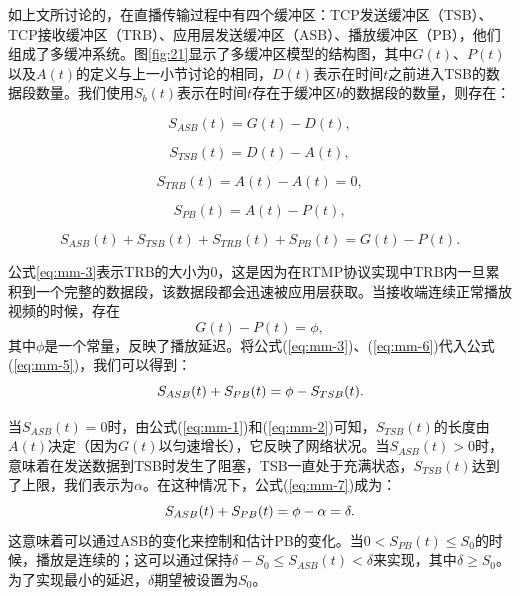 如上文所讨论的，在直播传输过程中有四个缓冲区：TCP发送缓冲区（TSB）、TCP接收缓冲区（TRB）、应用层发送缓冲区（ASB）、播放缓冲区（PB），他们组成了多缓冲系统。图\ref{fig:21}显示了多缓冲区模型的结构图，其中$G(t)$、$P(t)$以及$A(t)$的定义与上一小节讨论的相同，$D(t)$表示在时间$t$之前进入TSB的数据段数量。我们使用$S_b(t)$表示在时间$t$存在于缓冲区$b$的数据段的数量，则存在：

\begin{equation}
\label{eq:mm-1}
S_{ASB}(t)=G(t)-D(t),
\end{equation}

\begin{equation}
\label{eq:mm-2}
S_{TSB}(t)=D(t)-A(t),
\end{equation}

\begin{equation}
\label{eq:mm-3}
S_{TRB}(t)=A(t)-A(t)=0,
\end{equation}

\begin{equation}
\label{eq:mm-4}
S_{PB}(t) =A(t)-P(t),
\end{equation}

\begin{equation}
\label{eq:mm-5}
S_{ASB}(t)+S_{TSB}(t)+S_{TRB}(t)+S_{PB}(t)=G(t)-P(t).
\end{equation}

公式\ref{eq:mm-3}表示TRB的大小为0，这是因为在RTMP协议实现中TRB内一旦累积到一个完整的数据段，该数据段都会迅速被应用层获取。当接收端连续正常播放视频的时候，存在
\begin{equation}
\label{eq:mm-6}
G(t)-P(t)=\phi,
\end{equation}
其中$\phi$是一个常量，反映了播放延迟。将公式(\ref{eq:mm-3})、(\ref{eq:mm-6})代入公式(\ref{eq:mm-5})，我们可以得到：
\vspace{10pt}
\begin{equation}
\vspace{10pt}
\label{eq:mm-7}
S_{ASB}(t)+S_{PB}(t)=\phi-S_{TSB}(t).
\end{equation}

当$S_{ASB}(t)=0$时，由公式(\ref{eq:mm-1})和(\ref{eq:mm-2})可知，$S_{TSB}(t)$的长度由$A(t)$决定（因为$G(t)$以匀速增长），它反映了网络状况。当$S_{ASB}(t)>0$时，意味着在发送数据到TSB时发生了阻塞，TSB一直处于充满状态，$S_{TSB}(t)$达到了上限，我们表示为$\alpha$。在这种情况下，公式(\ref{eq:mm-7})成为：
\vspace{10pt}
\begin{equation}
\vspace{10pt}
\label{eq:mm-8}
S_{ASB}(t)+S_{PB}(t)=\phi-\alpha=\delta.
\end{equation}
这意味着可以通过ASB的变化来控制和估计PB的变化。当$0 < S_{PB}(t) \le S_0$的时候，播放是连续的；这可以通过保持$\delta - S_0 \le S_{ASB}(t) < \delta$来实现，其中$\delta \ge S_0$。为了实现最小的延迟，$\delta$期望被设置为$S_0$。

